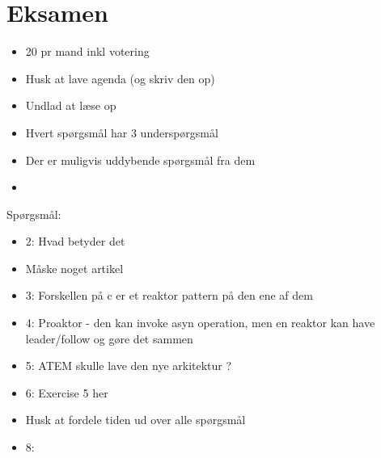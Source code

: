 \documentclass[oneside, 10pt]{memoir}
\begin{document}
\section*{Eksamen}
\begin{itemize}
	\item 20 pr mand inkl votering
	\item Husk at lave agenda (og skriv den op)
	\item Undlad at læse op
	\item Hvert spørgsmål har 3 underspørgsmål
	\item Der er muligvis uddybende spørgsmål fra dem
	\item 
\end{itemize}
Spørgsmål:
\begin{itemize}
	\item 2: Hvad betyder det
	\item Måske noget artikel

	\item 3: Forskellen på c er et reaktor pattern på den ene af dem

	\item 4: Proaktor - den kan invoke asyn operation, men en reaktor kan have leader/follow og gøre det sammen

	\item 5: ATEM skulle lave den nye arkitektur ?

	\item 6: Exercise 5 her
	\item[] Husk at fordele tiden ud over alle spørgsmål

	\item 8: 
\end{itemize}
\end{document}
